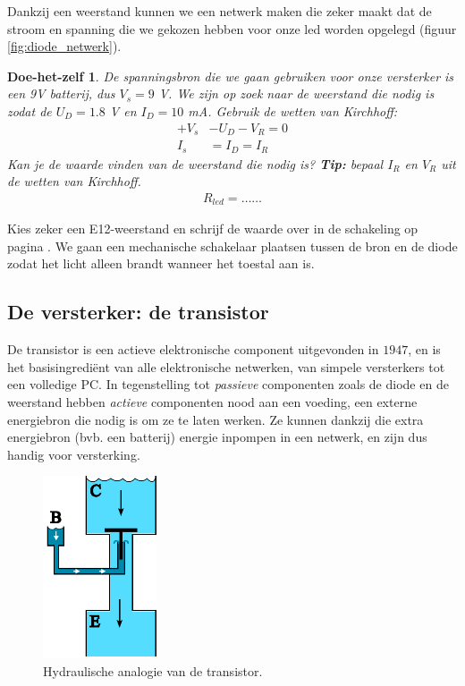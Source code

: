 \documentclass{article}
\newtheorem{DIY}{Doe-het-zelf}
\begin{document}
			Dankzij een weerstand kunnen we een netwerk maken die zeker maakt dat de stroom en spanning die we gekozen hebben voor onze led worden opgelegd (figuur \ref{fig:diode_netwerk}).
			
			\begin{DIY}
				De spanningsbron die we gaan gebruiken voor onze versterker is een 9V batterij, dus $V_s = 9$ V. We zijn op zoek naar de weerstand die nodig is zodat de $U_D = 1.8$ V en $I_D =10$ mA. Gebruik de wetten van Kirchhoff:
				\begin{align}
					+V_s &- U_D - V_R = 0  \\
					I_s &= I_D = I_R
				\end{align}
				 Kan je de waarde vinden van de weerstand die nodig is? \textbf{Tip:} bepaal $I_R$ en $V_R$ uit de wetten van Kirchhoff.
				\begin{align*}
				    R_{led} = \ldots\ldots
				\end{align*}
			\end{DIY}

			Kies zeker een E12-weerstand en schrijf de waarde over in de schakeling op pagina \pageref{fig:volledig_schema}.
			We gaan een mechanische schakelaar plaatsen tussen de bron en de diode zodat het licht alleen brandt wanneer het toestal aan is.

		\subsection{De versterker: de transistor}

			De transistor is een actieve elektronische component uitgevonden in $1947$, en is het basisingredi\"ent van alle elektronische netwerken, van simpele versterkers tot een volledige PC. In tegenstelling tot \emph{passieve} componenten zoals de diode en de weerstand hebben \emph{actieve} componenten nood aan een voeding, een externe energiebron die nodig is om ze te laten werken. Ze kunnen dankzij die extra energiebron (bvb. een batterij) energie inpompen in een netwerk, en zijn dus handig voor versterking.

			\begin{figure}[htbp]
				\centering
				\includegraphics[width=0.3\textwidth]{watertransistor}
				\caption{Hydraulische analogie van de transistor.}
				\label{fig:watertransistor}
			\end{figure}
\end{document}
